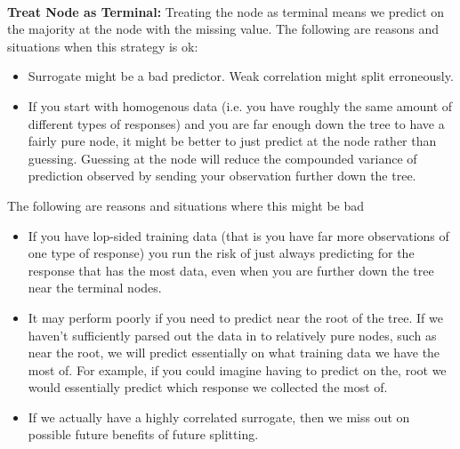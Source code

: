 \documentclass[11pt]{article}
\begin{document}
\begin{center}

\ \\
\end{center}


\vspace{5 mm}
\noindent
{\bf Treat Node as Terminal:} Treating the node as terminal means we predict on 
the majority at the node with the missing value. The following are reasons and 
situations when this strategy is ok:

\begin{itemize}
\item Surrogate might be a bad predictor. Weak correlation might split 
erroneously.
\item If you start with homogenous data (i.e. you have roughly the same amount 
of different types of responses) and you are far enough down the tree to have a 
fairly pure node, it might be better to just predict at the node rather than 
guessing. Guessing at the node will reduce the compounded variance of 
prediction observed by sending your observation further down the tree.
\end{itemize}

\vspace{2 mm}
\noindent
The following are reasons and situations where this might be bad

\begin{itemize}
\item If you have lop-sided training data (that is you have far more 
observations of one type of response) you run the risk of just always 
predicting for the response that has the most data, even when you are further 
down the tree near the terminal nodes.
\item It may perform poorly if you need to predict near the root of the tree. 
If we haven't sufficiently parsed out the data in to relatively pure nodes, 
such as near the root, we will predict essentially on what training data we 
have the most of. For example, if you could imagine having to predict on the, 
root we would essentially predict which response we collected the most of.
\item If we actually have a highly correlated surrogate, then we miss out on 
possible future benefits of future splitting.
\end{itemize}
\end{document}
